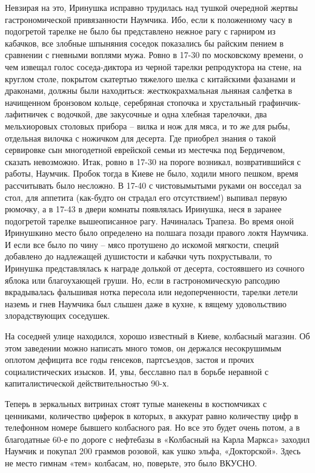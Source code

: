 Невзирая на это, Иринушка исправно трудилась над тушкой очередной жертвы
гастрономической привязанности Наумчика. Ибо, если к положенному часу в
подогретой тарелке не было бы представлено нежное рагу с гарниром из кабачков,
все злобные шпыняния соседок показались бы райским пением в сравнении с
гневными воплями мужа. Ровно в 17-30 по московскому времени, о чем извещал
голос соседа-диктора из черной тарелки репродуктора на стене, на круглом столе,
покрытом скатертью тяжелого шелка с китайскими фазанами и драконами, должны
были находиться: жесткокрахмальная льняная салфетка в начищенном бронзовом
кольце, серебряная стопочка и хрустальный графинчик-лафитничек с водочкой, две
закусочные и одна хлебная тарелочки, два мельхиоровых столовых прибора – вилка
и нож для мяса, и то же для рыбы, отдельная вилочка с ножичком для десерта. Где
приобрел знания о такой сервировке сын многодетной еврейской семьи из местечка
под Бердичевом, сказать невозможно. Итак, ровно в 17-30 на пороге возникал,
возвратившийся с работы, Наумчик. Пробок тогда в Киеве не было, ходили много
пешком, время рассчитывать было несложно. В 17-40 с чистовымытыми руками он
восседал за стол, для аппетита (как-будто он страдал его отсутствием!) выпивал
первую рюмочку, а в 17-43 в двери комнаты появлялась Иринушка, неся в заранее
подогретой тарелке вышеописанное рагу. Начиналась Трапеза. Во время оной
Иринушкино место было определено на полшага позади правого локтя Наумчика. И
если все было по чину – мясо протушено до искомой мягкости, специй добавлено до
надлежащей душистости и кабачки чуть похрустывали, то Иринушка представлялась к
награде долькой от десерта, состоявшего из сочного яблока или благоухающей
груши. Но, если в гастрономическую рапсодию вкрадывалась фальшивая нотка
пересола или недоперченности, тарелки летели наземь и гнев Наумчика был слышен
даже в кухне, к вящему удовольствию злорадствующих соседушек.

На соседней улице находился, хорошо известный в Киеве, колбасный магазин. Об
этом заведении можно написать много томов, он держался несокрушимым оплотом
дефицита все годы генсеков, партсъездов, застоя и прочих социалистических
изысков. И, увы, бесславно пал в борьбе неравной с капиталистической
действительностью 90-х.

Теперь в зеркальных витринах стоят тупые манекены в костюмчиках с ценниками,
количество циферок в которых, в аккурат равно количеству цифр в телефонном
номере бывшего колбасного рая. Но все это будет очень потом, а в благодатные
60-е по дороге с нефтебазы в «Колбасный на Карла Маркса» заходил Наумчик и
покупал 200 граммов розовой, как ушко эльфа, «Докторской». Здесь не место
гимнам «тем» колбасам, но, поверьте, это было ВКУСНО.

